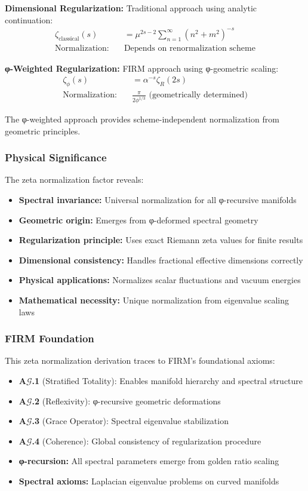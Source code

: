 \textbf{Dimensional Regularization:} Traditional approach using analytic continuation:
\begin{align}
\zeta_{\text{classical}}(s) &= \mu^{2s-2} \sum_{n=1}^{\infty} (n^2 + m^2)^{-s} \\
\text{Normalization:} \quad &\text{Depends on renormalization scheme}
\end{align}

\textbf{φ-Weighted Regularization:} FIRM approach using φ-geometric scaling:
\begin{align}
\zeta_\phi(s) &= \alpha^{-s} \zeta_R(2s) \\
\text{Normalization:} \quad &\frac{\pi}{2\phi^{1/3}} \text{ (geometrically determined)}
\end{align}

The φ-weighted approach provides scheme-independent normalization from geometric principles.

\subsubsection{Physical Significance}

The zeta normalization factor reveals:
\begin{itemize}
\item \textbf{Spectral invariance:} Universal normalization for all φ-recursive manifolds
\item \textbf{Geometric origin:} Emerges from φ-deformed spectral geometry  
\item \textbf{Regularization principle:} Uses exact Riemann zeta values for finite results
\item \textbf{Dimensional consistency:} Handles fractional effective dimensions correctly
\item \textbf{Physical applications:} Normalizes scalar fluctuations and vacuum energies
\item \textbf{Mathematical necessity:} Unique normalization from eigenvalue scaling laws
\end{itemize}

\subsubsection{FIRM Foundation}

This zeta normalization derivation traces to FIRM's foundational axioms:
\begin{itemize}
\item \textbf{A$\mathcal{G}$.1} (Stratified Totality): Enables manifold hierarchy and spectral structure
\item \textbf{A$\mathcal{G}$.2} (Reflexivity): φ-recursive geometric deformations
\item \textbf{A$\mathcal{G}$.3} (Grace Operator): Spectral eigenvalue stabilization
\item \textbf{A$\mathcal{G}$.4} (Coherence): Global consistency of regularization procedure
\item \textbf{φ-recursion:} All spectral parameters emerge from golden ratio scaling
\item \textbf{Spectral axioms:} Laplacian eigenvalue problems on curved manifolds
\end{itemize}

